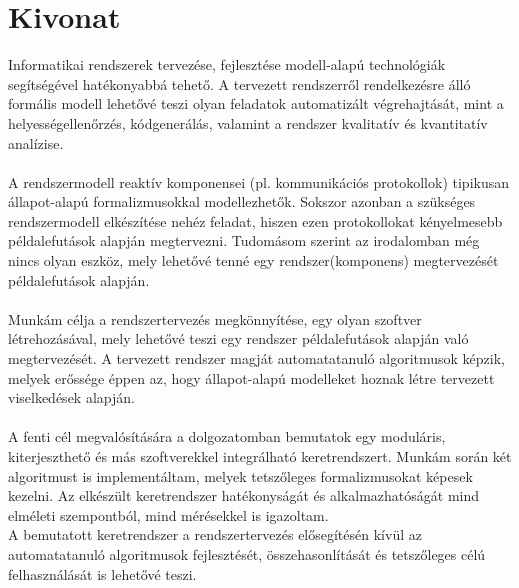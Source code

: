 \setcounter{page}{1}

\selecthungarian

\chapter*{Kivonat}

Informatikai rendszerek tervezése, fejlesztése modell-alapú technológiák segítségével hatékonyabbá tehető. A tervezett rendszerről rendelkezésre álló formális modell lehetővé teszi olyan feladatok automatizált végrehajtását, mint a helyességellenőrzés, kódgenerálás, valamint a rendszer kvalitatív és kvantitatív analízise.
\\\\
A rendszermodell reaktív komponensei (pl. kommunikációs protokollok) tipikusan állapot-alapú formalizmusokkal modellezhetők. Sokszor azonban a szükséges rendszermodell elkészítése nehéz feladat, hiszen ezen protokollokat kényelmesebb példalefutások alapján megtervezni. Tudomásom szerint az irodalomban még nincs olyan eszköz, mely lehetővé tenné egy rendszer(komponens) megtervezését példalefutások alapján.
\\\\
Munkám célja a rendszertervezés megkönnyítése, egy olyan szoftver létrehozásával, mely lehetővé teszi egy rendszer példalefutások alapján való megtervezését. A tervezett rendszer magját automatatanuló algoritmusok képzik, melyek erőssége éppen az, hogy állapot-alapú modelleket hoznak létre tervezett viselkedések alapján.
\\\\
A fenti cél megvalósítására a dolgozatomban bemutatok egy moduláris, kiterjeszthető és más szoftverekkel integrálható keretrendszert. Munkám során két algoritmust is implementáltam, melyek tetszőleges formalizmusokat képesek kezelni. Az elkészült keretrendszer hatékonyságát és alkalmazhatóságát mind elméleti szempontból, mind mérésekkel is igazoltam. 
\\
A bemutatott keretrendszer a rendszertervezés elősegítésén kívül az automatatanuló algoritmusok fejlesztését, összehasonlítását és tetszőleges célú felhasználását is lehetővé teszi.

\vfill
\selectenglish


